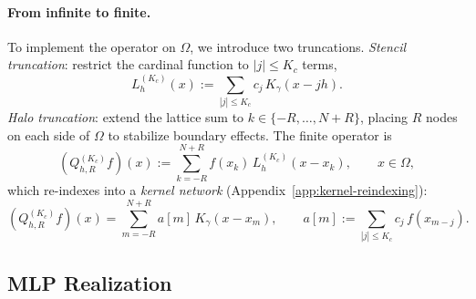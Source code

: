 \documentclass{article}
\begin{document}
\paragraph{From infinite to finite.}
To implement the operator on \(\Omega\), we introduce two truncations.  \emph{Stencil truncation}: restrict the cardinal function to \(|j|\le K_c\) terms,
\begin{equation}
  L_h^{(K_c)}(x) := \sum_{|j|\le K_c} c_j\,K_\gamma(x-jh).
  \label{eq:Lh-trunc}
\end{equation}
\emph{Halo truncation}: extend the lattice sum to \(k\in\{-R,\ldots,N{+}R\}\), placing \(R\) nodes on each side of \(\Omega\) to stabilize boundary effects.  The finite operator is
\begin{equation}
  (Q_{h,R}^{(K_c)} f)(x) := \sum_{k=-R}^{N+R} f(x_k)\,L_h^{(K_c)}(x-x_k),
  \qquad x\in\Omega,
  \label{eq:finite-op}
\end{equation}
which re-indexes into a \emph{kernel network} (Appendix~\ref{app:kernel-reindexing}):
\begin{equation}
  (Q_{h,R}^{(K_c)} f)(x)
  = \sum_{m=-R}^{N+R} a[m]\,K_\gamma(x-x_m),
  \qquad
  a[m] := \sum_{|j|\le K_c} c_j\,f(x_{m-j}).
  \label{eq:kernel-network}
\end{equation}

\subsection{MLP Realization}
\label{subsec:mlp-realization}
\end{document}
